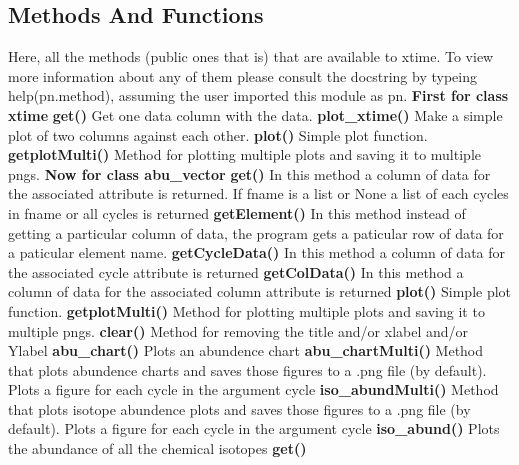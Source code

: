 \subsection{Methods And Functions}
Here, all the methods (public ones that is) that are available to xtime. To view more information 
about any of them please consult the docstring by typeing help(pn.method), assuming
the user imported this module as pn.\newline
\newline
{\bf First for class xtime}\newline
{\bf get()}
Get one data column with the data.\newline
{\bf plot\_xtime()}
Make a simple plot of two columns against each other.\newline
{\bf plot()}
Simple plot function.\newline
{\bf getplotMulti()}
Method for plotting multiple plots and saving it to multiple pngs.\newline
\newline
{\bf Now for class abu\_vector}\newline
{\bf get()}
In this method a column of data for the associated attribute is
returned. If fname is a list or None a list of each cycles in 
fname or all cycles is returned\newline
{\bf getElement()}
In this method instead of getting a particular column of data,
the program gets a paticular row of data for a paticular 
element name.\newline
{\bf getCycleData()}
In this method a column of data for the associated cycle attribute is returned\newline
{\bf getColData()}
In this method a column of data for the associated column attribute is returned\newline
{\bf plot()}
Simple plot function.\newline
{\bf getplotMulti()}
Method for plotting multiple plots and saving it to multiple pngs.\newline
{\bf clear()}
Method for removing the title and/or xlabel and/or Ylabel \newline
{\bf abu\_chart()}
Plots an abundence chart\newline
{\bf abu\_chartMulti()}
Method that plots abundence charts and saves those figures to a .png file (by default). Plots a figure for each cycle in the argument cycle\newline
{\bf iso\_abundMulti()}
Method that plots isotope abundence plots and saves those figures to a .png file (by default). Plots a figure for each cycle in the argument cycle\newline
{\bf iso\_abund()}
Plots the abundance of all the chemical isotopes
{\bf get()}
		
